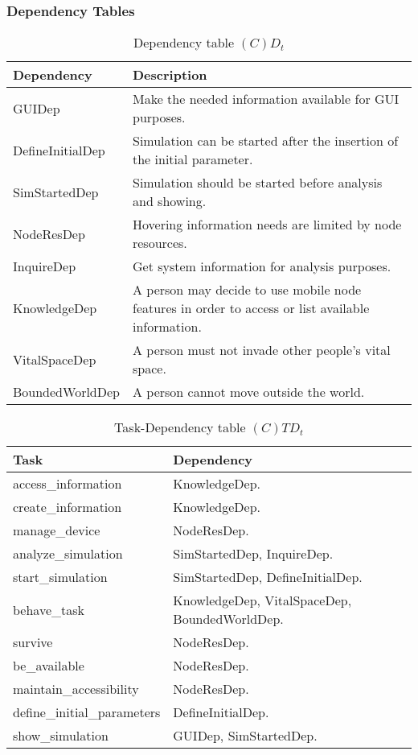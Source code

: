 \subsubsection{Dependency Tables}

\begin{table}[H]
	\centering
	\begin{tabular}{|p{4cm}|p{8cm}|}
			\hline
			\textbf{Dependency} & \textbf{Description} \\
			\hline
			GUIDep & Make the needed information available for GUI purposes. \\
			\hline
			DefineInitialDep & Simulation can be started after the insertion of the
			initial parameter. \\
			\hline
			SimStartedDep & Simulation should be started before analysis and showing. \\
			\hline
			NodeResDep & Hovering information needs are limited by node resources. \\
			\hline
			InquireDep & Get system information for analysis purposes. \\
			\hline
			KnowledgeDep & A person may decide to use mobile node features in order
			to access or list available information. \\
			\hline
			VitalSpaceDep & A person must not invade other people's vital space. \\
			\hline
			BoundedWorldDep & A person cannot move outside the world. \\
			\hline
		\end{tabular}
	\caption{Dependency table $(C)D_t$}
	\label{tab:cdt}
\end{table}

\begin{table}[H]
	\centering
	\begin{tabular}{|p{5cm}|p{7cm}|}
			\hline
			\textbf{Task} & \textbf{Dependency} \\
			\hline
			access\_information & KnowledgeDep. \\
			\hline
			create\_information & KnowledgeDep. \\
			\hline
			manage\_device & NodeResDep. \\
			\hline
			analyze\_simulation & SimStartedDep, InquireDep. \\
			\hline
			start\_simulation & SimStartedDep, DefineInitialDep. \\
			\hline
			behave\_task & KnowledgeDep, VitalSpaceDep, BoundedWorldDep. \\
			\hline
			survive & NodeResDep. \\
			\hline
			be\_available & NodeResDep. \\
			\hline
			maintain\_accessibility & NodeResDep. \\
			\hline
			define\_initial\_parameters & DefineInitialDep. \\
			\hline
			show\_simulation & GUIDep, SimStartedDep. \\
			\hline
		\end{tabular}
	\caption{Task-Dependency table $(C)TD_t$}
	\label{tab:ctdt}
\end{table}

